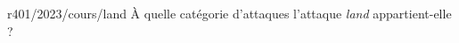 \begin{question}{r401/2023/cours/land}
  À quelle catégorie d'attaques l'attaque {\em land} appartient-elle ?
  \begin{reponseshoriz}
  \end{reponseshoriz}
\end{question}
